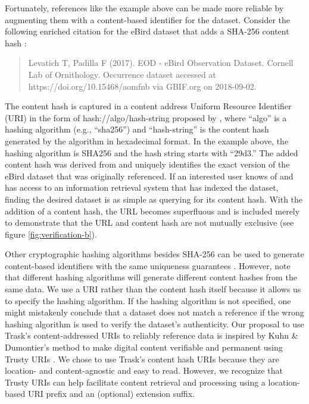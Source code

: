 Fortunately, references like the example above can be made more reliable by augmenting them with a content-based identifier for the dataset. Consider the following enriched citation for the eBird dataset that adds a SHA-256 content hash :

\begin{quote}
Levatich T, Padilla F (2017). EOD - eBird Observation Dataset. Cornell Lab of Ornithology. Occurrence dataset  accessed at https://doi.org/10.15468/aomfnb via GBIF.org on 2018-09-02.
\end{quote}

The content hash is captured in a content address Uniform Resource Identifier (URI) \citep{rfc3986} in the form of hash://algo/hash-string proposed by \citep{Trask_2015}, where ``algo'' is a hashing algorithm (e.g., ``sha256'') and ``hash-string'' is the content hash generated by the algorithm in hexadecimal format. In the example above, the hashing algorithm is SHA256 and the hash string starts with ``29d3.'' The added content hash was derived from and uniquely identifies the exact version of the eBird dataset that was originally referenced. If an interested user knows of and has access to an information retrieval system that has indexed the dataset, finding the desired dataset is as simple as querying for its content hash. With the addition of a content hash, the URL becomes superfluous and is included merely to demonstrate that the URL and content hash are not mutually exclusive (see figure \ref{fig:verification-b}).

Other cryptographic hashing algorithms besides SHA-256 can be used to generate content-based identifiers with the same uniqueness guarantees . However, note that different hashing algorithms will generate different content hashes from the same data. We use a URI rather than the content hash itself because it allows us to specify the hashing algorithm. If the hashing algorithm is not specified, one might mistakenly conclude that a dataset does not match a reference if the wrong hashing algorithm is used to verify the dataset's authenticity. Our proposal to use Trask's content-addressed URIs to reliably reference data is inspired by Kuhn \& Dumontier's method to make digital content verifiable and permanent using Trusty URIs \citep{Kuhn_2015}. We chose to use Trask's content hash URIs because they are location- and content-agnostic and easy to read. However, we recognize that Trusty URIs can help facilitate content retrieval and processing using a location-based URI prefix and an (optional) extension suffix.

